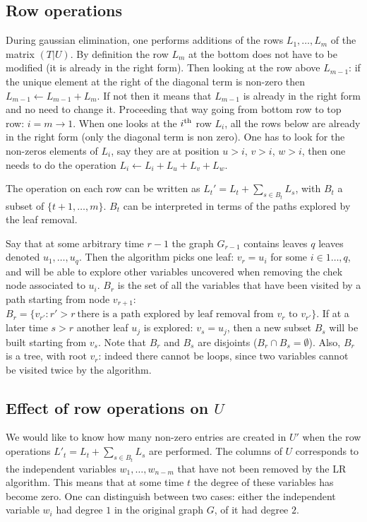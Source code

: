 \documentclass{article}
\begin{document}
\subsection*{Row operations}

During gaussian elimination, one performs additions of the rows $L_1,\dots,L_m$ of the matrix $(T|U)$. By definition the row $L_m$ at the bottom does not have to be modified (it is already in the right form). Then looking at the row above $L_{m-1}$:
if the unique element at the right of the diagonal term is non-zero then $L_{m-1} \leftarrow L_{m-1}+L_m$. If not then it means that $L_{m-1}$ is already in the right form and no need to change it. Proceeding that way going from bottom row to top row: $i=m\to 1$. When one looks at the $i^{\rm th}$ row $L_i$, all the rows below are already in the right form (only the diagonal term is non zero). One has to look for the non-zeros elements of $L_i$, say they are at position $u>i$, $v>i$, $w>i$, then one needs to do the operation $L_i \leftarrow L_i+L_u+L_v+L_w$.

The operation on each row can be written as $L_t'=L_t+\sum_{s\in B_t}L_s$, with $B_t$ a subset of $\{t+1,\dots,m\}$. $B_t$ can be interpreted in terms of the paths explored by the leaf removal. 

Say that at some arbitrary time $r-1$ the graph $G_{r-1}$ contains leaves $q$ leaves denoted $u_1,\dots,u_q$. Then the algorithm picks one leaf: $v_r=u_i$ for some $i\in{1\dots,q}$, and will be able to explore other variables uncovered when removing the chek node associated to $u_i$. $B_r$ is the set of all the variables that have been visited by a path starting from node $v_{r+1}$: $B_r=\{v_{r'}: r'>r \ \text{there is a path explored by leaf removal from } v_r \text{ to } v_{r'} \}$. If at a later time $s>r$ another leaf $u_j$ is explored: $v_s=u_j$, then a new subset $B_s$ will be built starting from $v_s$. Note that $B_r$ and $B_s$ are disjoints ($B_r\cap B_s=\emptyset$). Also, $B_r$ is a tree, with root $v_r$: indeed there cannot be loops, since two variables cannot be visited twice by the algorithm.

\subsection*{Effect of row operations on $U$}

We would like to know how many non-zero entries are created in $U'$ when the row operations $L'_{t}=L_t+\sum_{s\in B_t}L_s$ are performed. The columns of $U$ corresponds to the independent variables $w_1,\dots,w_{n-m}$ that have not been removed by the LR algorithm. This means that at some time $t$ the degree of these variables has become zero. One can distinguish between two cases: either the independent variable $w_i$ had degree $1$ in the original graph $G$, of it had degree $2$. 
\end{document}
